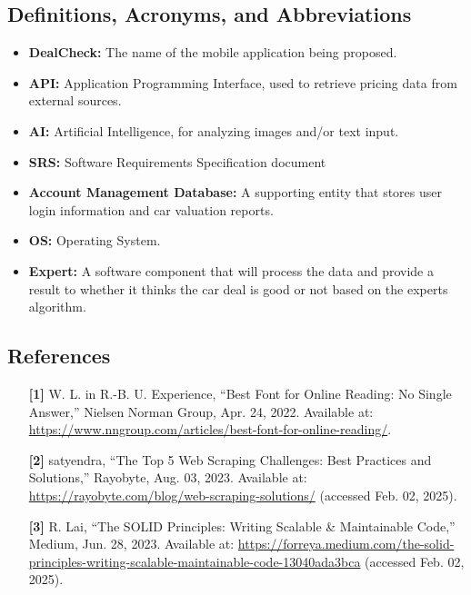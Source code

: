 \documentclass[]{article}
\begin{document}
\subsection{Definitions, Acronyms, and Abbreviations}
\label{sub:definitions_acronyms_and_abbreviations}
\begin{itemize}
\item \textbf{DealCheck:} The name of the mobile application being proposed.
\item \textbf{API:} Application Programming Interface, used to retrieve pricing data from external sources.
\item \textbf{AI:} Artificial Intelligence, for analyzing images and/or text input.
\item \textbf{SRS:} Software Requirements Specification document 
\item \textbf{Account Management Database:} A supporting entity that stores user login information and car valuation reports. 
\item \textbf{OS:} Operating System.
\item \textbf{Expert:} A software component that will process the data and provide a result to whether it thinks the car deal is good or not based on the experts algorithm.
\end{itemize}

\subsection{References}
\label{sub:references}
\begin{enumerate}
    \item [\textbf{[1]}] W. L. in R.-B. U. Experience, “Best Font for Online Reading: No Single Answer,” Nielsen Norman Group, Apr. 24, 2022. Available at: \url{https://www.nngroup.com/articles/best-font-for-online-reading/}.
    
    \item [\textbf{[2]}] satyendra, “The Top 5 Web Scraping Challenges: Best Practices and Solutions,” Rayobyte, Aug. 03, 2023. Available at: \url{https://rayobyte.com/blog/web-scraping-solutions/} (accessed Feb. 02, 2025).
    
    \item [\textbf{[3]}] R. Lai, “The SOLID Principles: Writing Scalable \& Maintainable Code,” Medium, Jun. 28, 2023. Available at: \url{https://forreya.medium.com/the-solid-principles-writing-scalable-maintainable-code-13040ada3bca} (accessed Feb. 02, 2025).
\end{enumerate}
\end{document}
